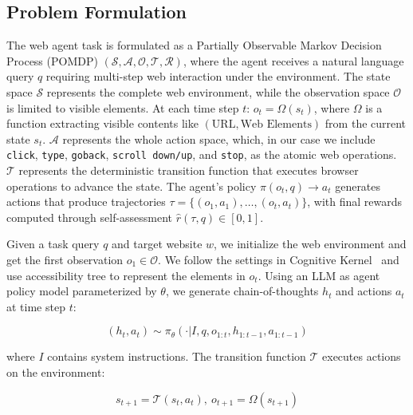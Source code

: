 \documentclass[11pt]{article}
\begin{document}
\subsection{Problem Formulation}

The web agent task is formulated as a Partially Observable Markov Decision Process (POMDP) 
$(\mathcal{S}, \mathcal{A}, \mathcal{O}, \mathcal{T}, \mathcal{R})$,
where the agent receives a natural language query $q$ requiring multi-step web interaction under the environment. 
The state space $\mathcal{S}$ represents the complete web environment, 
while the observation space $\mathcal{O}$ is limited to visible elements. At each time step $t$: $o_t = \Omega(s_t)$, where $\Omega$ is a function extracting visible contents like $(\text{URL}, \text{Web Elements})$ from the current state $s_t$. 
$\mathcal{A}$ represents the whole action space, which, in our case we include \texttt{click}, \texttt{type}, \texttt{goback}, \texttt{scroll down/up}, and \texttt{stop}, as the atomic web operations.
$\mathcal{T}$ represents the deterministic transition function that executes browser operations to advance the state.
The agent's policy $\pi(o_t, q) \rightarrow a_t$ generates actions that produce trajectories $\tau = \{(o_1,a_1),\ldots,(o_t,a_t)\}$, 
with final rewards computed through self-assessment $\hat{r}(\tau, q) \in [0,1]$. 

Given a task query $q$ and target website $w$, we initialize the web environment and get the first observation $o_1 \in \mathcal{O}$. 
We follow the settings in Cognitive Kernel~\citep{cognitive_kernel} and use accessibility tree to represent the elements in $o_t$.
Using an LLM as agent policy model parameterized by $\theta$, we generate chain-of-thoughts $h_t$ and actions $a_t$ at time step $t$:


\begin{equation}
(h_t, a_t) \sim \pi_\theta(\cdot|I, q, o_{1:t}, h_{1:t-1}, a_{1:t-1})
\end{equation}

where $I$ contains system instructions. 
The transition function $\mathcal{T}$ executes actions on the environment:

\begin{equation}
s_{t+1} = \mathcal{T}(s_t, a_t), \ o_{t+1} = \Omega(s_{t+1})
\end{equation}
\end{document}
